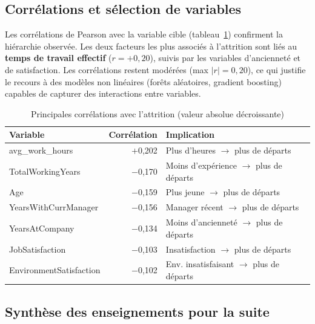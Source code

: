 \subsection{Corrélations et sélection de variables}

Les corrélations de Pearson avec la variable cible (tableau~\ref{tab:correlations}) confirment la hiérarchie observée. Les deux facteurs les plus associés à l'attrition sont liés au \textbf{temps de travail effectif} ($r = +0,20$), suivis par les variables d'ancienneté et de satisfaction. Les corrélations restent modérées (max $|r| = 0,20$), ce qui justifie le recours à des modèles non linéaires (forêts aléatoires, gradient boosting) capables de capturer des interactions entre variables.

\begin{table}[htbp]
\centering
\caption{Principales corrélations avec l'attrition (valeur absolue décroissante)}
\label{tab:correlations}
\small
\begin{tabular}{l r l}
\toprule
\textbf{Variable} & \textbf{Corrélation} & \textbf{Implication} \\
\midrule
avg\_work\_hours & $+$0,202 & Plus d'heures $\rightarrow$ plus de départs \\
TotalWorkingYears & $-$0,170 & Moins d'expérience $\rightarrow$ plus de départs \\
Age & $-$0,159 & Plus jeune $\rightarrow$ plus de départs \\
YearsWithCurrManager & $-$0,156 & Manager récent $\rightarrow$ plus de départs \\
YearsAtCompany & $-$0,134 & Moins d'ancienneté $\rightarrow$ plus de départs \\
JobSatisfaction & $-$0,103 & Insatisfaction $\rightarrow$ plus de départs \\
EnvironmentSatisfaction & $-$0,102 & Env. insatisfaisant $\rightarrow$ plus de départs \\
\bottomrule
\end{tabular}
\end{table}

\subsection{Synthèse des enseignements pour la suite}

